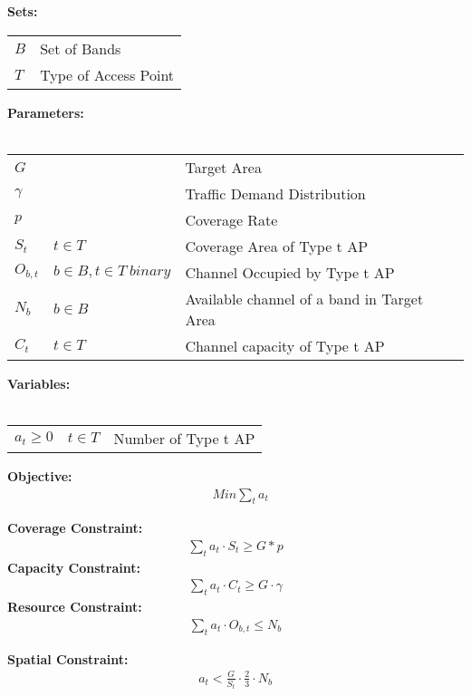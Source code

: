 \noindent
{\bf Sets:}
\begin{tabular}{ll}
$B$ & Set of Bands \\
$T$ & Type of Access Point\\
\end{tabular}

\noindent
{\bf Parameters:}\\
\\
\begin{tabular}{llp{3.4cm}}
$G$ &  & Target Area\\
$\gamma$ & & Traffic Demand Distribution\\
$p$ & & Coverage Rate\\
$S_t$ & $t \in T$ & Coverage Area of Type t AP\\
$O_{b,t}$ & $b \in B, t \in T\ binary$ & Channel Occupied by Type t AP\\
$N_b$ & $b \in B\ $ & Available channel of a band in Target Area\\
$C_t$ & $t \in T$ & Channel capacity of Type t AP\\
\end{tabular}


\noindent
{\bf Variables:}\\
\\
\begin{tabular}{llr}
$a_t\ge0$ & $t \in T$ & Number of Type t AP\\ 
\end{tabular}

\noindent
{\bf Objective:}
\begin{align}
& Min \sum_t a_t
\end{align}

\noindent
{\bf Coverage Constraint:}
\begin{align}
\label{opt:coverage}
\sum_t a_t\cdot S_t \ge G*p
\end{align}
\noindent
{\bf Capacity Constraint:} 
\begin{align}
\label{opt:capacity}
\sum_t a_t\cdot C_t \ge G\cdot \gamma
\end{align}
\noindent
{\bf Resource Constraint:} 
\begin{align}
\label{opt:resource}
\sum_t a_t\cdot O_{b,t} \le N_b
\end{align}

{\bf Spatial Constraint:} 
\begin{align}
\label{opt:resource}
a_t < \frac{G}{S_t}\cdot\frac{2}{3}\cdot N_b
\end{align}
